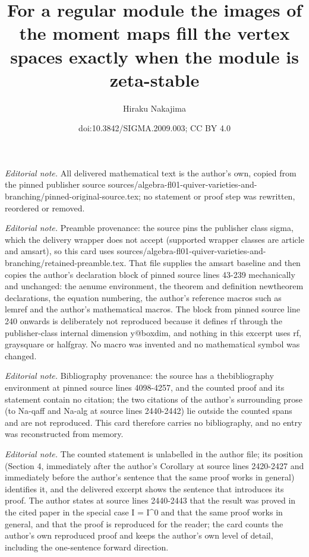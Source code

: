 \documentclass[10pt,a4paper]{amsart}
\title{For a regular module the images of the moment maps fill the vertex spaces exactly when the module is zeta-stable}
\author{Hiraku Nakajima}
\date{doi:10.3842/SIGMA.2009.003; CC BY 4.0}
\theoremstyle{definition}
\numberwithin{equation}{section}
\begin{document}
\maketitle
\noindent\textit{Editorial note.} All delivered mathematical text is the author's own, copied from the pinned publisher source sources/algebra-fl01-quiver-varieties-and-branching/pinned-original-source.tex; no statement or proof step was rewritten, reordered or removed.\par\medskip
\noindent\textit{Editorial note.} Preamble provenance: the source pins the publisher class sigma, which the delivery wrapper does not accept (supported wrapper classes are article and amsart), so this card uses sources/algebra-fl01-quiver-varieties-and-branching/retained-preamble.tex. That file supplies the amsart baseline and then copies the author's declaration block of pinned source lines 43-239 mechanically and unchanged: the aenume environment, the theorem and definition newtheorem declarations, the equation numbering, the author's reference macros such as lemref and the author's mathematical macros. The block from pinned source line 240 onwards is deliberately not reproduced because it defines rf through the publisher-class internal dimension y@boxdim, and nothing in this excerpt uses rf, graysquare or halfgray. No macro was invented and no mathematical symbol was changed.\par\medskip
\noindent\textit{Editorial note.} Bibliography provenance: the source has a thebibliography environment at pinned source lines 4098-4257, and the counted proof and its statement contain no citation; the two citations of the author's surrounding prose (to Na-qaff and Na-alg at source lines 2440-2442) lie outside the counted spans and are not reproduced. This card therefore carries no bibliography, and no entry was reconstructed from memory.\par\medskip
\noindent\textit{Editorial note.} The counted statement is unlabelled in the author file; its position (Section 4, immediately after the author's Corollary at source lines 2420-2427 and immediately before the author's sentence that the same proof works in general) identifies it, and the delivered excerpt shows the sentence that introduces its proof. The author states at source lines 2440-2443 that the result was proved in the cited paper in the special case I = I\textasciicircum{}0 and that the same proof works in general, and that the proof is reproduced for the reader; the card counts the author's own reproduced proof and keeps the author's own level of detail, including the one-sentence forward direction.\par\medskip
\end{document}
